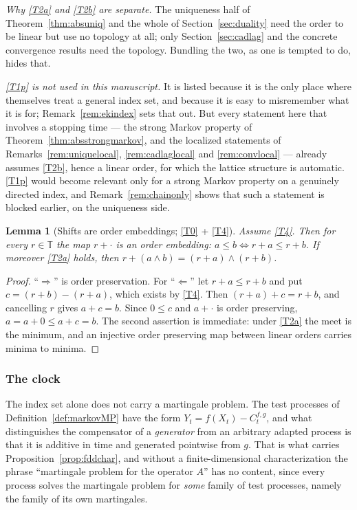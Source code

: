 \documentclass[11pt,a4paper]{article}
\theoremstyle{plain}
\newtheorem{lemma}[theorem]{Lemma}
\theoremstyle{definition}
\theoremstyle{remark}
\newcommand{\T}{\mathbb{T}}                     %
\newcommand{\EK}{\cite{EK86}}
\begin{document}
\emph{Why \eqref{T2a} and \eqref{T2b} are separate.}  The uniqueness half of
Theorem~\ref{thm:absuniq} and the whole of Section~\ref{sec:duality} need the
order to be linear but use no topology at all; only Section~\ref{sec:cadlag} and
the concrete convergence results need the topology.  Bundling the two, as one is
tempted to do, hides that.

\emph{\eqref{T1p} is not used in this manuscript.}  It is listed because it is the
only place where \EK{} themselves treat a general index set, and because it is
easy to misremember what it is for; Remark~\ref{rem:ekindex} sets that out.  But
every statement here that involves a stopping time --- the strong Markov property
of Theorem~\ref{thm:absstrongmarkov}, and the localized statements of
Remarks~\ref{rem:uniquelocal}, \ref{rem:cadlaglocal} and \ref{rem:convlocal} ---
already assumes \eqref{T2b}, hence a linear order, for which the lattice structure is
automatic.  \eqref{T1p} would become relevant only for a strong Markov property on a
genuinely directed index, and Remark~\ref{rem:chainonly} shows that such a
statement is blocked earlier, on the uniqueness side.

\begin{lemma}[Shifts are order embeddings; \eqref{T0} + \eqref{T4}]
  \label{lem:shiftembed}
  Assume \eqref{T4}.  Then for every $r \in \T$ the map $r + \cdot$ is an order
  embedding: $a \leq b \iff r + a \leq r + b$.  If moreover \eqref{T2a} holds, then
  $r + (a \wedge b) = (r+a) \wedge (r+b)$.
\end{lemma}

\begin{proof}
  ``$\Rightarrow$'' is order preservation.  For ``$\Leftarrow$'' let
  $r + a \leq r + b$ and put $c = (r+b) - (r+a)$, which exists by \eqref{T4}.  Then
  $(r+a) + c = r + b$, and cancelling $r$ gives $a + c = b$.  Since $0 \leq c$
  and $a + \cdot$ is order preserving, $a = a + 0 \leq a + c = b$.  The second
  assertion is immediate: under \eqref{T2a} the meet is the minimum, and an injective
  order preserving map between linear orders carries minima to minima.
\end{proof}

\subsubsection*{The clock}

The index set alone does not carry a martingale problem.  The test processes of
Definition~\ref{def:markovMP} have the form $Y_t = f(X_t) - C^{f,g}_t$, and what
distinguishes the compensator of a \emph{generator} from an arbitrary adapted
process is that it is additive in time and generated pointwise from $g$.  That
is what carries Proposition~\ref{prop:fddchar}, and without a
finite-dimensional characterization the phrase ``martingale problem for the
operator $A$'' has no content, since every process solves the martingale problem
for \emph{some} family of test processes, namely the family of its own
martingales.
\end{document}
